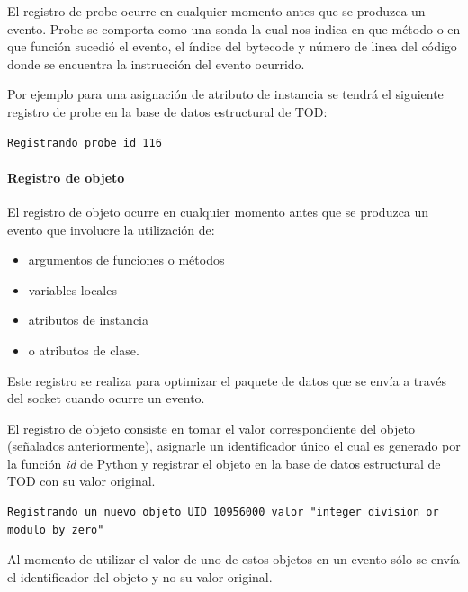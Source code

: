 \documentclass[12pt,legalpaper]{report}
\begin{document}
El registro de probe ocurre en cualquier momento antes que se produzca un evento.  Probe se comporta como una sonda la cual nos indica en que método o en que función sucedió el evento, el índice del bytecode y número de linea del código donde se encuentra la instrucción del evento ocurrido.

Por ejemplo para una asignación de atributo de instancia se tendrá el siguiente registro de probe en la base de datos estructural de TOD:

\begin{singlespace}
\begin{lstlisting}[style=consola,numbers=none]
Registrando probe id 116
\end{lstlisting}
\end{singlespace}

				\paragraph{Registro de objeto}
				
El registro de objeto ocurre en cualquier momento antes que se produzca un evento que involucre la utilización de:
\begin{itemize}
	\item argumentos de funciones o métodos
	\item variables locales
	\item atributos de instancia
	\item o atributos de clase.  
\end{itemize}

Este registro se realiza para optimizar el paquete de datos que se envía a través del socket cuando ocurre un evento.

El registro de objeto consiste en tomar el valor correspondiente del objeto (señalados anteriormente), asignarle un identificador único el cual es generado por la función \textit{id} de Python y registrar el objeto en la base de datos estructural de TOD con su valor original.

\begin{singlespace}
\begin{lstlisting}[style=consola,numbers=none]
Registrando un nuevo objeto UID 10956000 valor "integer division or modulo by zero"
\end{lstlisting}
\end{singlespace}

Al momento de utilizar el valor de uno de estos objetos en un evento sólo se envía el identificador del objeto y no su valor original.
\end{document}
